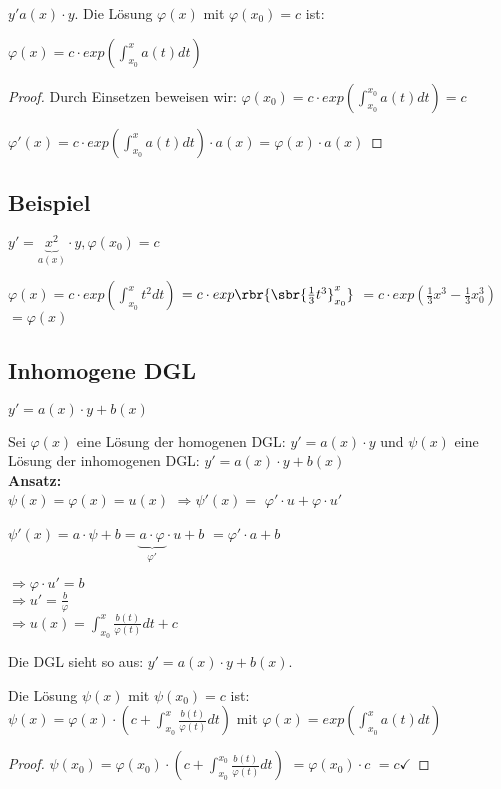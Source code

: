 \begin{satz}
$y'a(x) \cdot y$. Die Lösung $\varphi(x)$ mit $\varphi(x_0) = c$ ist: 

$\varphi(x) = c \cdot exp(\int_{x_0}^{x} a(t) dt)$ 
\end{satz}

\begin{proof}Durch Einsetzen beweisen wir: 
$\varphi(x_0) = c\cdot exp(\int_{x_0}^{x_0} a(t) dt) = c$

$\varphi'(x) = c \cdot exp(\int_{x_0}^{x} a(t) dt) \cdot a(x) = \varphi(x) \cdot a(x)$
\end{proof}

\subsection{Beispiel}
$y' = \underbrace{x^2}_{a(x)} \cdot y, \varphi(x_0) = c$

$\varphi(x) = c\cdot exp(\int_{x_0}^{x} t^2 dt) $
$=c \cdot exp\rbr{\sbr{\frac{1}{3} t^3}_{x_0}^x}$
$=c\cdot exp(\frac{1}{3} x^3 - \frac{1}{3} x_0^3)$
$=\varphi(x)$

\subsection{Inhomogene DGL}
$ y' = a(x) \cdot y + b(x) $

Sei $ \varphi(x) $ eine Lösung der homogenen DGL: $ y' = a(x) \cdot y $ und 
$ \psi(x) $ eine Lösung der inhomogenen DGL: $ y' = a(x) \cdot y + b(x) $\\

\textbf{Ansatz:}\\
$ \psi(x) = \varphi(x) = u(x) $
$ \Rightarrow \psi'(x) = $ \underline{$\varphi' \cdot u + \varphi \cdot u'$} 

$ \psi'(x) = a \cdot \psi + b = \underbrace{a\cdot \varphi}_{\varphi'} \cdot u + b $
\underline{$=\varphi' \cdot a + b$}

$\Rightarrow \varphi \cdot u' = b$\\
$\Rightarrow u' = \frac{b}{\varphi}$\\
$\Rightarrow u(x) = \int_{x_0}^{x} \frac{b(t)}{\varphi(t)} dt + c$

\begin{satz}
Die DGL sieht so aus: $y' = a(x) \cdot y + b(x)$. 

Die Lösung $\psi(x)$ mit $\psi(x_0) = c$ ist: \\

$\psi(x) = \varphi(x) \cdot (c+\int_{x_0}^{x} \frac{b(t)}{\varphi(t)} dt)$ mit
$\varphi(x) = exp(\int_{x_0}^{x} a(t) dt)$
\end{satz}

\begin{proof}
$ \psi(x_0) = \varphi(x_0) \cdot (c+ \int_{x_0}^{x_0} \frac{b(t)}{\varphi(t)} dt)$
$=\varphi(x_0) \cdot c $
$=c \checkmark$
\end{proof}